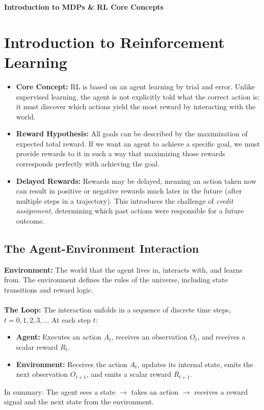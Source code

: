 \begin{center}
    \Large\textbf{\textcolor{primary}{Introduction to MDPs \& RL Core Concepts}}
\end{center}
\vspace{0.5cm}

\section{\textcolor{secondary}{Introduction to Reinforcement Learning}}
\begin{itemize}
    \item \textbf{Core Concept:} RL is based on an agent learning by trial and error. Unlike supervised learning, the agent is not explicitly told what the correct action is; it must discover which actions yield the most reward by interacting with the world.
    \item \textbf{Reward Hypothesis:} All goals can be described by the maximization of expected total reward. If we want an agent to achieve a specific goal, we must provide rewards to it in such a way that maximizing those rewards corresponds perfectly with achieving the goal.
    \item \textbf{Delayed Rewards:} Rewards may be delayed, meaning an action taken now can result in positive or negative rewards much later in the future (after multiple steps in a trajectory). This introduces the challenge of \textit{credit assignment}, determining which past actions were responsible for a future outcome.
\end{itemize}

\subsection{\textcolor{secondary}{The Agent-Environment Interaction}}
\noindent\textbf{Environment:} The world that the agent lives in, interacts with, and learns from. The environment defines the rules of the universe, including state transitions and reward logic.\\
\\
\textbf{The Loop:} The interaction unfolds in a sequence of discrete time steps, $t = 0, 1, 2, 3, \dots$ At each step $t$:
\begin{itemize}
    \item \textbf{Agent:} Executes an action $A_t$, receives an observation $O_t$, and receives a scalar reward $R_t$.
    \item \textbf{Environment:} Receives the action $A_t$, updates its internal state, emits the next observation $O_{t+1}$, and emits a scalar reward $R_{t+1}$.
\end{itemize}
In summary: The agent sees a state $\rightarrow$ takes an action $\rightarrow$ receives a reward signal and the next state from the environment.

